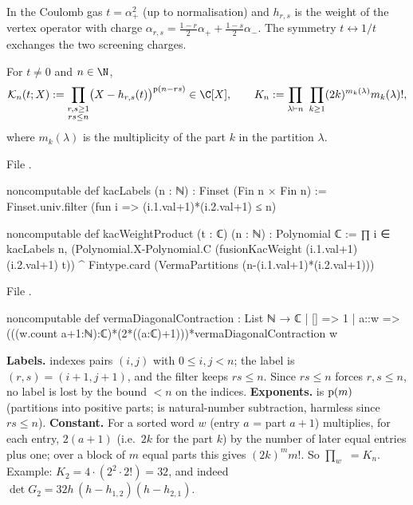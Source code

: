 \begin{physics}
In the Coulomb gas $t = \alpha_+^2$ (up to normalisation) and $h_{r,s}$ is the weight of the vertex
operator with charge $\alpha_{r,s} = \frac{1-r}2\alpha_++\frac{1-s}2\alpha_-$. The symmetry $t\leftrightarrow1/t$
exchanges the two screening charges.
\end{physics}

\begin{definition}\label{l06:def:kacproduct}
For $t\ne0$ and $n\in\N$,
\begin{equation*}
 \mathcal K_n(t;X) := \prod_{\substack{r,s\ge1\\ rs\le n}}\bigl(X-h_{r,s}(t)\bigr)^{\lsixpp(n-rs)}\in\C[X],
 \qquad
 K_n := \prod_{\lambda\vdash n}\ \prod_{k\ge1}(2k)^{m_k(\lambda)}m_k(\lambda)!,
\end{equation*}
where $m_k(\lambda)$ is the multiplicity of the part $k$ in the partition $\lambda$.
\end{definition}

File .
\begin{leancode}
noncomputable def kacLabels (n : ℕ) : Finset (Fin n × Fin n) :=
  Finset.univ.filter (fun i => (i.1.val+1)*(i.2.val+1) ≤ n)

noncomputable def kacWeightProduct (t : ℂ) (n : ℕ) : Polynomial ℂ :=
  ∏ i ∈ kacLabels n,
    (Polynomial.X-Polynomial.C (fusionKacWeight (i.1.val+1) (i.2.val+1) t)) ^
      Fintype.card (VermaPartitions (n-(i.1.val+1)*(i.2.val+1)))
\end{leancode}
File .
\begin{leancode}
noncomputable def vermaDiagonalContraction : List ℕ → ℂ
  | [] => 1
  | a::w => (((w.count a+1:ℕ):ℂ)*(2*((a:ℂ)+1)))*vermaDiagonalContraction w
\end{leancode}

\begin{dictionary}
\textbf{Labels.}  indexes pairs $(i,j)$ with $0\le i,j<n$; the label is
$(r,s) = (i+1,j+1)$, and the filter keeps $rs\le n$. Since $rs\le n$ forces $r,s\le n$, no label is lost by
the bound $<n$ on the indices. \textbf{Exponents.} \allowbreak{} is $\mathrm{p}(m)$
(partitions into positive parts;  is natural-number subtraction, harmless since $rs\le n$).
\textbf{Constant.} For a sorted word $w$ (entry $a$ = part $a+1$) 
multiplies, for each entry, $2(a+1)$ (i.e.\ $2k$ for the part $k$) by the number of later equal entries plus
one; over a block of $m$ equal parts this gives $(2k)^mm!$. So
$\prod_{w}$ $= K_n$. Example: $K_2 = 4\cdot(2^2\cdot2!) = 32$, and indeed
$\det G_2 = 32h\,(h-h_{1,2})(h-h_{2,1})$.
\end{dictionary}

